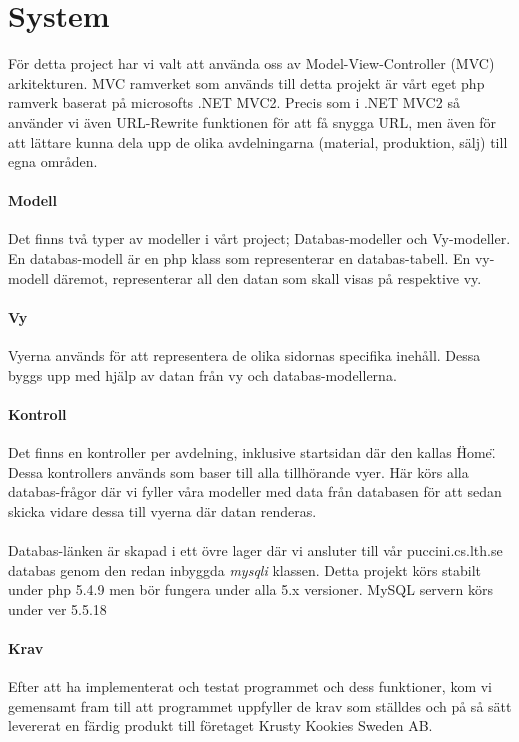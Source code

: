 \section{System}

För detta project har vi valt att använda oss av Model-View-Controller (MVC) arkitekturen.
MVC ramverket som används till detta projekt är vårt eget php ramverk baserat på microsofts .NET MVC2.
Precis som i .NET MVC2 så använder vi även URL-Rewrite funktionen för att få snygga URL, men även för att lättare kunna dela upp de olika avdelningarna (material, produktion, sälj) till egna områden.

\paragraph{Modell}
Det finns två typer av modeller i vårt project; Databas-modeller och Vy-modeller.
En databas-modell är en php klass som representerar en databas-tabell.
En vy-modell däremot, representerar all den datan som skall visas på respektive vy.

\paragraph{Vy}
Vyerna används för att representera de olika sidornas specifika inehåll. Dessa byggs upp med hjälp av datan från vy och databas-modellerna.

\paragraph{Kontroll}
Det finns en kontroller per avdelning, inklusive startsidan där den kallas \"Home\". Dessa kontrollers används som baser till alla tillhörande vyer.
Här körs alla databas-frågor där vi fyller våra modeller med data från databasen för att sedan skicka vidare dessa till vyerna där datan renderas.\\
\\
Databas-länken är skapad i ett övre lager där vi ansluter till vår puccini.cs.lth.se databas genom den redan inbyggda \textit{mysqli} klassen.
Detta projekt körs stabilt under php 5.4.9 men bör fungera under alla 5.x versioner.
MySQL servern körs under ver 5.5.18

\paragraph{Krav}
Efter att ha implementerat och testat programmet och dess funktioner, kom vi gemensamt fram till att programmet uppfyller de krav som ställdes och på så sätt levererat en färdig produkt till företaget Krusty Kookies Sweden AB. 
